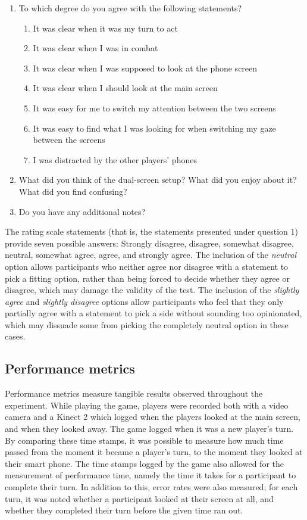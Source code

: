 \begin{enumerate}
	\item To which degree do you agree with the following statements?
	\begin{enumerate}
		\item It was clear when it was my turn to act
		\item It was clear when I was in combat
		\item It was clear when I was supposed to look at the phone screen
		\item It was clear when I should look at the main screen
		\item It was easy for me to switch my attention between the two screens
		\item It was easy to find what I was looking for when switching my gaze between the screens
		\item I was distracted by the other players' phones
	\end{enumerate}
	\item What did you think of the dual-screen setup? What did you enjoy about it? What did you find confusing?
	\item Do you have any additional notes?
\end{enumerate}

The rating scale statements (that is, the statements presented under question 1) provide seven possible answers: Strongly disagree, disagree, somewhat disagree, neutral, somewhat agree, agree, and strongly agree. The inclusion of the \textit{neutral} option allows participants who neither agree nor disagree with a statement to pick a fitting option, rather than being forced to decide whether they agree or disagree, which may damage the validity of the test. The inclusion of the \textit{slightly agree} and \textit{slightly disagree} options allow participants who feel that they only partially agree with a statement to pick a side without sounding too opinionated, which may dissuade some from picking the completely neutral option in these cases.

\subsection{Performance metrics}\label{subsec:performance_metrics}
Performance metrics measure tangible results observed throughout the experiment. While playing the game, players were recorded both with a video camera and a Kinect 2 which logged when the players looked at the main screen, and when they looked away. The game logged when it was a new player's turn. By comparing these time stamps, it was possible to measure how much time passed from the moment it became a player's turn, to the moment they looked at their smart phone. The time stamps logged by the game also allowed for the measurement of performance time, namely the time it takes for a participant to complete their turn. In addition to this, error rates were also measured; for each turn, it was noted whether a participant looked at their screen at all, and whether they completed their turn before the given time ran out. 

